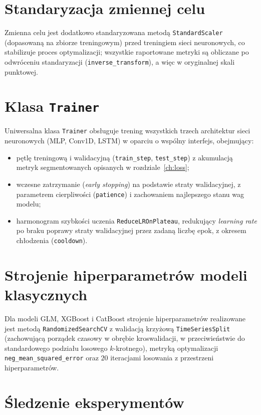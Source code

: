\documentclass[a4paper,twoside,11pt]{mwrep}
\theoremstyle{plain} \newtheorem{thm}{Twierdzenie}
\theoremstyle{plain} \newtheorem{lem}{Lemat}
\theoremstyle{definition} \newtheorem{defn}{Definicja}
\theoremstyle{remark} \newtheorem*{rem}{Wniosek}
\begin{document}
\section{Standaryzacja zmiennej celu}

Zmienna celu jest dodatkowo standaryzowana metodą \texttt{StandardScaler}
(dopasowaną na zbiorze treningowym) przed treningiem sieci neuronowych, co
stabilizuje proces optymalizacji; wszystkie raportowane metryki są
obliczane po odwróceniu standaryzacji (\texttt{inverse\_transform}), a więc w
oryginalnej skali punktowej.

\section{Klasa \texttt{Trainer}}

Uniwersalna klasa \texttt{Trainer} obsługuje trening wszystkich trzech
architektur sieci neuronowych (MLP, Conv1D, LSTM) w oparciu o wspólny
interfejs, obejmujący:
\begin{itemize}
    \item pętlę treningową i walidacyjną (\texttt{train\_step},
    \texttt{test\_step}) z akumulacją metryk segmentowanych opisanych w
    rozdziale~\ref{ch:loss};
    \item wczesne zatrzymanie (\emph{early stopping}) na podstawie straty
    walidacyjnej, z parametrem cierpliwości (\texttt{patience}) i
    zachowaniem najlepszego stanu wag modelu;
    \item harmonogram szybkości uczenia \texttt{ReduceLROnPlateau},
    redukujący \emph{learning rate} po braku poprawy straty walidacyjnej
    przez zadaną liczbę epok, z okresem chłodzenia (\texttt{cooldown}).
\end{itemize}

\section{Strojenie hiperparametrów modeli klasycznych}

Dla modeli GLM, XGBoost i CatBoost strojenie hiperparametrów realizowane
jest metodą \texttt{RandomizedSearchCV} z walidacją krzyżową
\texttt{TimeSeriesSplit} (zachowującą porządek czasowy w obrębie kroswalidacji,
w przeciwieństwie do standardowego podziału losowego $k$-krotnego),
metryką optymalizacji \texttt{neg\_mean\_squared\_error} oraz $20$
iteracjami losowania z przestrzeni hiperparametrów.

\section{Śledzenie eksperymentów}
\end{document}
